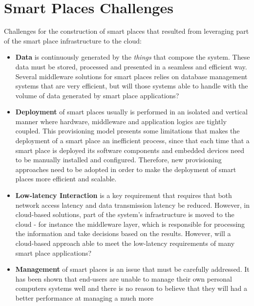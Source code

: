 \section{Smart Places Challenges}
\label{section:challenges}
Challenges \cite{caceres2012ubicomp} for the construction of smart places that resulted from leveraging
part of the smart place infrastructure to the cloud:\\

\begin{itemize}
  \item \textbf{Data} is continuously generated by the \textit{things} that compose the system.
  These data must be stored, processed and presented in a seamless and efficient way. Several
  middleware solutions for smart places \cite{floerkemeier2007rfid}\cite{eisenhauer2010hydra}\cite{de2008socrades}
  relies on database management systems that are very efficient, but will those systems able to
  handle with the volume of data generated by smart place applications?
  \item \textbf{Deployment} of smart places usually is performed in an isolated and vertical manner
  where hardware, middleware and application logics are tightly coupled. This provisioning model presents
  some limitations that makes the deployment of a smart place an inefficient process, since that each
  time that a smart place is deployed its software components and embedded devices need to be manually
  installed and configured. Therefore, new provisioning approaches need to be adopted in order to make
  the deployment of smart places more efficient and scalable.
  \item \textbf{Low-latency Interaction} is a key requirement that requires that both network access
  latency and data transmission latency be reduced. However, in cloud-based solutions, part of the
  system's infrastructure is moved to the cloud - for instance the middleware layer, which is responsible
  for processing the information and take decisions based on the results. However, will a cloud-based
  approach able to meet the low-latency requirements of many smart place applications?
  \item \textbf{Management} of smart places is an issue that must be carefully addressed. It has been
  shown that end-users are unable to manage their own personal computers systems well \cite{doll1988measurement}
  and there is no reason to believe that they will had a better performance at managing a much more

\end{itemize}
